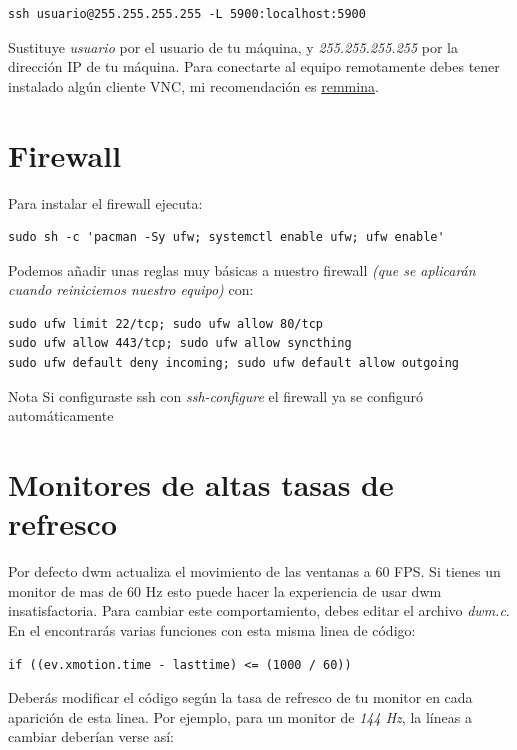 \documentclass[11pt]{article}
\begin{document}
\begin{verbatim}
ssh usuario@255.255.255.255 -L 5900:localhost:5900
\end{verbatim}

Sustituye \emph{usuario} por el usuario de tu máquina, y \emph{255.255.255.255} por la dirección IP de tu máquina. Para conectarte al equipo remotamente debes tener instalado algún cliente VNC, mi recomendación es \href{https://github.com/FreeRDP/Remmina}{remmina}.

\section{Firewall}

Para instalar el firewall ejecuta:

\begin{verbatim}
sudo sh -c 'pacman -Sy ufw; systemctl enable ufw; ufw enable'
\end{verbatim}

Podemos añadir unas reglas muy básicas a nuestro firewall \emph{(que se aplicarán cuando reiniciemos nuestro equipo)} con:

\begin{verbatim}
sudo ufw limit 22/tcp; sudo ufw allow 80/tcp
sudo ufw allow 443/tcp; sudo ufw allow syncthing
sudo ufw default deny incoming; sudo ufw default allow outgoing
\end{verbatim}

\begin{mybox}{Nota}
	Si configuraste ssh con \emph{ssh-configure} el firewall ya se configuró automáticamente
\end{mybox}

\section{Monitores de altas tasas de refresco}

Por defecto dwm actualiza el movimiento de las ventanas a 60 FPS. Si tienes un monitor de mas de 60 Hz esto puede hacer la experiencia de usar dwm insatisfactoria. Para cambiar este comportamiento, debes editar el archivo \emph{dwm.c}. En el encontrarás varias funciones con esta misma linea de código:

\begin{verbatim}
if ((ev.xmotion.time - lasttime) <= (1000 / 60))
\end{verbatim}

Deberás modificar el código según la tasa de refresco de tu monitor en cada aparición de esta linea. Por ejemplo, para un monitor de \emph{144 Hz}, la líneas a cambiar deberían verse así:
\end{document}
